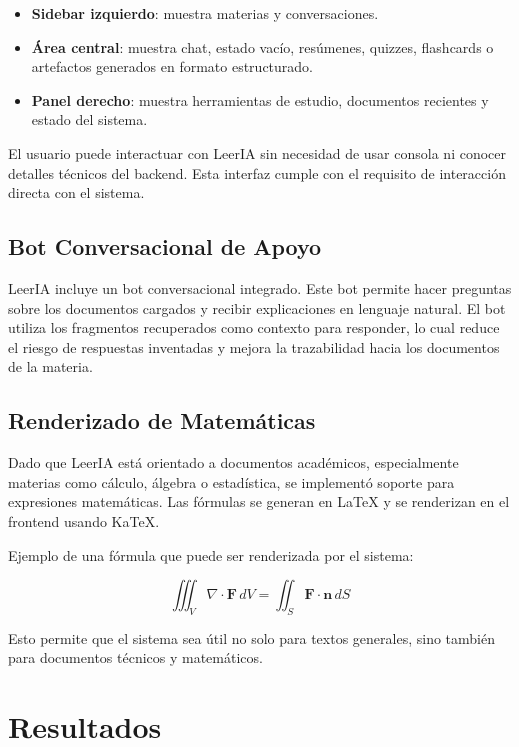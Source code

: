 \documentclass[12pt, letterpaper]{article}
\begin{document}
	\begin{itemize}
		\item \textbf{Sidebar izquierdo}: muestra materias y conversaciones.
		\item \textbf{Área central}: muestra chat, estado vacío, resúmenes, quizzes, flashcards o artefactos generados en formato estructurado.
		\item \textbf{Panel derecho}: muestra herramientas de estudio, documentos recientes y estado del sistema.
	\end{itemize}
	
	El usuario puede interactuar con LeerIA sin necesidad de usar consola ni conocer detalles técnicos del backend. Esta interfaz cumple con el requisito de interacción directa con el sistema.
	
	\subsection{Bot Conversacional de Apoyo}
	
	LeerIA incluye un bot conversacional integrado. Este bot permite hacer preguntas sobre los documentos cargados y recibir explicaciones en lenguaje natural. El bot utiliza los fragmentos recuperados como contexto para responder, lo cual reduce el riesgo de respuestas inventadas y mejora la trazabilidad hacia los documentos de la materia.
	
	\subsection{Renderizado de Matemáticas}
	
	Dado que LeerIA está orientado a documentos académicos, especialmente materias como cálculo, álgebra o estadística, se implementó soporte para expresiones matemáticas. Las fórmulas se generan en LaTeX y se renderizan en el frontend usando KaTeX.
	
	Ejemplo de una fórmula que puede ser renderizada por el sistema:
	
	\[
	\iiint_V \nabla \cdot \mathbf{F}\, dV =
	\iint_S \mathbf{F} \cdot \mathbf{n}\, dS
	\]
	
	Esto permite que el sistema sea útil no solo para textos generales, sino también para documentos técnicos y matemáticos.
	

	\section{Resultados}
	
\end{document}
